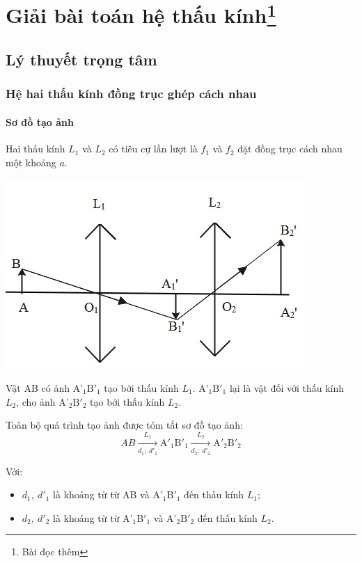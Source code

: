 \chapter[Giải bài toán hệ thấu kính]{Giải bài toán hệ thấu kính\footnote{Bài đọc thêm}}
\section{Lý thuyết trọng tâm}

\subsection{Hệ hai thấu kính đồng trục ghép cách nhau}
\subsubsection{Sơ đồ tạo ảnh}
Hai thấu kính $L_1$ và $L_2$ có tiêu cự lần lượt là $f_1$ và $f_2$ đặt đồng trục cách nhau một khoảng $a$.
\begin{center}
	\includegraphics[scale=0.8]{../figs/VN11-PH-39-L-027-1-h28.jpg}
\end{center}

Vật AB có ảnh $\text{A'}_1\text{B}'_1$ tạo bởi thấu kính $L_1$. $\text{A'}_1\text{B}'_1$ lại là vật đối với thấu kính $L_2$, cho ảnh $\text{A'}_2\text{B}'_2$ tạo bởi thấu kính $L_2$.

Toàn bộ quá trình tạo ảnh được tóm tắt sơ đồ tạo ảnh:
\begin{equation}
{AB}\xrightarrow[d_1;\ d'_1]{L_1} \text{A}'_1\text{B}'_1 \xrightarrow[d_2;\ d'_2]{L_2}\text{A}'_2\text{B}'_2
\end{equation}
	
Với: 
\begin{itemize}
	\item $d_1,\ d'_1$ là khoảng từ từ AB và $\text{A'}_1\text{B}'_1$ đến thấu kính $L_1$;
	\item $d_2,\ d'_2$ là khoảng từ từ $\text{A'}_1\text{B}'_1$ và $\text{A'}_2\text{B}'_2$ đến thấu kính $L_2$.
\end{itemize}




